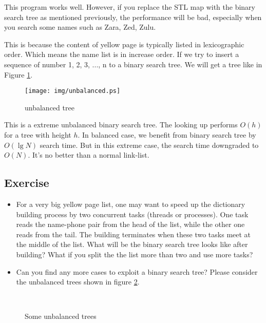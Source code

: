 \documentclass{article}
\begin{document}
This program works well. However, if you replace the STL map 
with the binary search tree as mentioned previously, the 
performance will be bad, especially when you search some names such
as Zara, Zed, Zulu.

This is because the content of yellow page is typically listed
in lexicographic order. Which means the name list is in increase
order. If we try to insert a sequence of number 1, 2, 3, ..., n 
to a binary search tree. We will get a tree like in Figure \ref{fig:unbalanced-tree}.

\begin{figure}[htbp]
       \centering
	\texttt{[image: img/unbalanced.ps]}
        \caption{unbalanced tree} \label{fig:unbalanced-tree}
\end{figure}

This is a extreme unbalanced binary search tree. The looking up performs
$O(h)$ for a tree with height $h$. In balanced case, we benefit from 
binary search tree by $O(\lg N)$ search time. But in this extreme case, 
the search time downgraded to $O(N)$. It's no better than a normal link-list.

\subsection*{Exercise}

\begin{itemize}
\item For a very big yellow page list, one may want to speed up the
dictionary building process by two concurrent tasks (threads or processes).
One task reads the name-phone pair from the head of the list, while the
other one reads from the tail. The building terminates when these
two tasks meet at the middle of the list. What will be the binary
search tree looks like after building? What if you split the the
list more than two and use more tasks?

\item Can you find any more cases to exploit a binary search tree?
Please consider the unbalanced trees shown in figure 
\ref{fig:unbalanced-trees}.
\end{itemize}

\begin{figure}[htbp]
       \centering
        \\
       \caption{Some unbalanced trees} 
       \label{fig:unbalanced-trees}
\end{figure}
\end{document}
